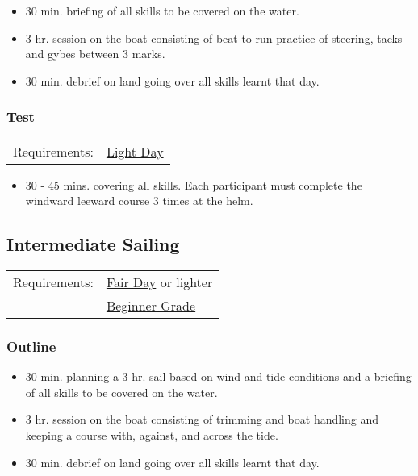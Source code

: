 \documentclass[12pt]{scrartcl}
\begin{document}
\begin{itemize}
	\item 30 min. briefing of all skills to be covered on the water.
	\item 3 hr. session on the boat consisting of beat to run practice of steering, tacks and gybes between 3 marks.
	\item 30 min. debrief on land going over all skills learnt that day.
\end{itemize}

\subsubsection{Test} \label{subsubsec:basic sailing 2:test}

\label{tab:basic sailing 2:test:requirements}
\begin{tabular}{ll}
	Requirements: & \hyperlink{condition:light day}{Light Day} \\
\end{tabular}

\begin{itemize}
	\item 30 - 45 mins. covering all skills. Each participant must complete the windward leeward course 3 times at the helm.
\end{itemize}

\subsection{Intermediate Sailing} \label{subsec:intermediate sailing}

\label{tab:intermediate sailing:requirements}
\begin{tabular}{ll}
	Requirements: & \hyperlink{condition:fair day}{Fair Day} or lighter \\
	& \hyperlink{grade:beginner}{Beginner Grade} \\
\end{tabular}

\subsubsection{Outline} \label{subsubsec:intermediate sailing:outline}

\begin{itemize}
	\item 30 min. planning a 3 hr. sail based on wind and tide conditions and a briefing of all skills to be covered on the water.
	\item 3 hr. session on the boat consisting of trimming and boat handling and keeping a course with, against, and across the tide.
	\item 30 min. debrief on land going over all skills learnt that day.
\end{itemize}
\end{document}
